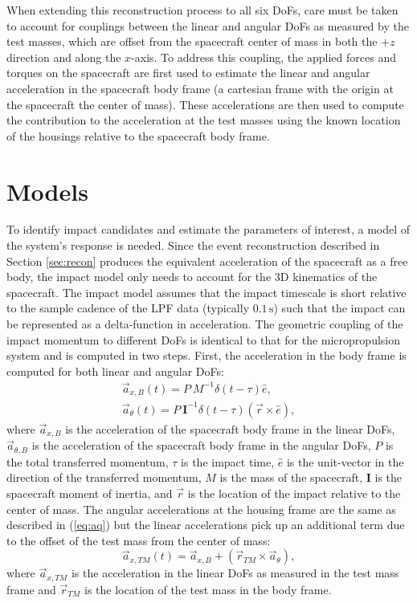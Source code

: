 \documentclass[a4paper]{jpconf}
\begin{document}
When extending this reconstruction process to all six DoFs, care must be taken to account for couplings between the linear and angular DoFs as measured by the test masses, which are offset from the spacecraft center of mass in both the $+z$ direction and along the $x$-axis. To address this coupling, the applied forces and torques on the spacecraft are first used to estimate the linear and angular acceleration in the spacecraft body frame (a cartesian frame with the origin at the spacecraft the center of mass). These accelerations are then used to compute the contribution to the acceleration at the test masses using the known location of the housings relative to the spacecraft body frame.

\section{Models}
\label{sec:models}
To identify impact candidates and estimate the parameters of interest, a model of the system's response is needed. Since the event reconstruction described in Section \ref{sec:recon} produces the equivalent acceleration of the spacecraft as a free body, the impact model only needs to account for the 3D kinematics of the spacecraft. The impact model assumes that the impact timescale is short relative to the sample cadence of the LPF data (typically $0.1\,\textrm{s}$) such that the impact can be represented as a delta-function in acceleration. The geometric coupling of the impact momentum to different DoFs is identical to that for the micropropulsion system and is computed in two steps. First, the acceleration in the body frame is computed for both linear and angular DoFs:
\begin{eqnarray}
\vec{a}_{x,B}(t) = P\:M^{-1}\delta(t-\tau) \hat{e},\label{eq:axB} \\
\vec{a}_{\theta}(t)= P\:\mathbf{I}^{-1}\delta(t-\tau)\left(\vec{r}\times\hat{e}\right), \label{eq:aq}
\end{eqnarray}
where $\vec{a}_{x,B}$ is the acceleration of the spacecraft body frame in the linear DoFs, $\vec{a}_{\theta,B}$ is the acceleration of the spacecraft body frame in the angular DoFs, $P$ is the total transferred momentum, $\tau$ is the impact time, $\hat{e}$ is the unit-vector in the direction of the transferred momentum, $M$ is the mass of the spacecraft, $\mathbf{I}$ is the spacecraft moment of inertia, and $\vec{r}$ is the location of the impact relative to the center of mass. The angular accelerations at the housing frame are the same as described in (\ref{eq:aq}) but the linear accelerations pick up an additional term due to the offset of the test mass from the center of mass:
\begin{equation}
\vec{a}_{x,TM}(t) = \vec{a}_{x,B} + \left(\vec{r}_{TM}\times \vec{a}_{\theta}\right),\label{eq:axTM}
\end{equation}
where $\vec{a}_{x,TM}$ is the acceleration in the linear DoFs as measured in the test mass frame and $\vec{r}_{TM}$ is the location of the test mass in the body frame.
\end{document}
